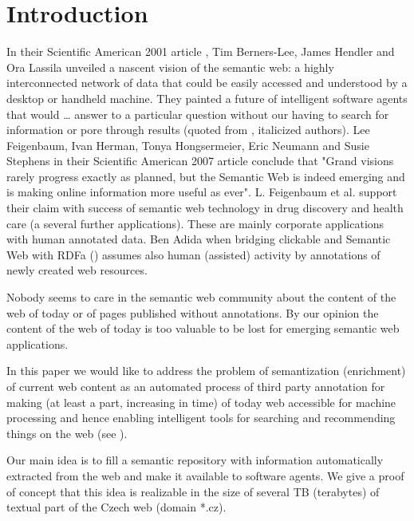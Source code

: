 \documentclass{sig-alternate}
\begin{document}


\section{Introduction}
In their Scientific American 2001 article \cite{biblio:2001-Berners-Lee-SemanticWeb}, Tim Berners-Lee, James Hendler and Ora Lassila unveiled a nascent vision of the semantic web: a highly interconnected network of data that could be easily accessed and understood by a desktop or handheld machine. They painted a future of intelligent software agents that would {\dots} answer to a particular question without our having to search for information or pore through results (quoted from \cite{biblio:feigenbaum_semantic_2007}, italicized authors). Lee Feigenbaum, Ivan Herman, Tonya Hongsermeier, Eric Neumann and Susie Stephens in their Scientific American 2007 article \cite{biblio:feigenbaum_semantic_2007} conclude that "Grand visions rarely progress exactly as planned, but the Semantic Web is indeed emerging and is making online information more useful as ever". L. Feigenbaum et al. support their claim with success of semantic web technology in drug discovery and health care (a several further applications). These are mainly corporate applications with human annotated data. Ben Adida when bridging clickable and Semantic Web with RDFa (\cite{biblio:AdidaClickable}) assumes also human (assisted) activity by annotations of newly created web resources. 

Nobody seems to care in the semantic web community about the content of the web of today or of pages published without annotations. By our opinion the content of the web of today is too valuable to be lost for emerging semantic web applications. 

In this paper we would like to address the problem of semantization (enrichment) of current web content as an automated process of third party annotation for making (at least a part, increasing in time) of today web accessible for machine processing and hence enabling intelligent tools for searching and recommending things on the web (see \cite{biblio:LeeWebThings}). 

Our main idea is to fill a semantic repository with information automatically extracted from the web and make it available to software agents. We give a proof of concept that this idea is realizable in the size of several TB (terabytes) of textual part of the Czech web (domain *.cz).
\end{document}

